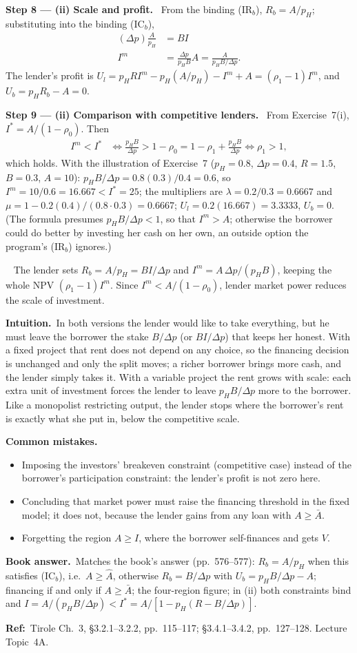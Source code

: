 \documentclass[11pt,a4paper]{article}
\newcommand{\step}[2]{\par\medskip\noindent\textbf{Step #1 --- #2.}~}
\newcommand{\intuition}{\par\medskip\noindent\textbf{Intuition.}~}
\newcommand{\bookans}{\par\medskip\noindent\textbf{Book answer.}~}
\newcommand{\refbib}{\par\smallskip\noindent\textbf{Ref:}~}
\newcommand{\answer}[1]{\par\smallskip\noindent\fbox{\textbf{Answer #1.}}~}
\newcommand{\pitfalls}{\par\medskip\noindent\textbf{Common mistakes.}}
\begin{document}
\step{8}{(ii) Scale and profit} From the binding (IR$_b$), $R_b=A/p_H$; substituting into the
binding (IC$_b$),
\begin{align}
  (\Delta p)\frac{A}{p_H} &= BI \nonumber\\
  I^m &= \frac{\Delta p}{p_HB}A = \frac{A}{p_HB/\Delta p}. \label{r4e8-Im}
\end{align}
The lender's profit is $U_l=p_HRI^m-p_H(A/p_H)-I^m+A=(\rho_1-1)I^m$, and $U_b=p_HR_b-A=0$.

\step{9}{(ii) Comparison with competitive lenders} From Exercise~7(i), $I^*=A/(1-\rho_0)$. Then
\begin{align}
  I^m<I^* &\iff \frac{p_HB}{\Delta p}>1-\rho_0 = 1-\rho_1+\frac{p_HB}{\Delta p} \iff \rho_1>1, \nonumber
\end{align}
which holds. With the illustration of Exercise~7 ($p_H=0.8$, $\Delta p=0.4$, $R=1.5$, $B=0.3$,
$A=10$): $p_HB/\Delta p=0.8(0.3)/0.4=0.6$, so $I^m=10/0.6=16.667<I^*=25$; the multipliers are
$\lambda=0.2/0.3=0.6667$ and $\mu=1-0.2(0.4)/(0.8\cdot0.3)=0.6667$; $U_l=0.2(16.667)=3.3333$,
$U_b=0$. (The formula presumes $p_HB/\Delta p<1$, so that $I^m>A$; otherwise the borrower could
do better by investing her cash on her own, an outside option the program's (IR$_b$) ignores.)

\answer{(ii)} The lender sets $R_b=A/p_H=BI/\Delta p$ and $I^m=A\,\Delta p/(p_HB)$, keeping the
whole NPV $(\rho_1-1)I^m$. Since $I^m<A/(1-\rho_0)$, lender market power reduces the scale of
investment.

\intuition In both versions the lender would like to take everything, but he must leave the
borrower the stake $B/\Delta p$ (or $BI/\Delta p$) that keeps her honest. With a fixed project
that rent does not depend on any choice, so the financing decision is unchanged and only the
split moves; a richer borrower brings more cash, and the lender simply takes it. With a variable
project the rent grows with scale: each extra unit of investment forces the lender to leave
$p_HB/\Delta p$ more to the borrower. Like a monopolist restricting output, the lender stops
where the borrower's rent is exactly what she put in, below the competitive scale.
\pitfalls
\begin{itemize}
  \item Imposing the investors' breakeven constraint (competitive case) instead of the
        borrower's participation constraint: the lender's profit is not zero here.
  \item Concluding that market power must raise the financing threshold in the fixed model; it
        does not, because the lender gains from any loan with $A\ge\bar A$.
  \item Forgetting the region $A\ge I$, where the borrower self-finances and gets $V$.
\end{itemize}
\bookans Matches the book's answer (pp.~576--577): $R_b=A/p_H$ when this satisfies (IC$_b$),
i.e.\ $A\ge\hat A$, otherwise $R_b=B/\Delta p$ with $U_b=p_HB/\Delta p-A$; financing if and only if
$A\ge\bar A$; the four-region figure; in (ii) both constraints bind and
$I=A/(p_HB/\Delta p)<I^*=A/[1-p_H(R-B/\Delta p)]$.
\refbib{Tirole Ch.~3, \S3.2.1--3.2.2, pp.~115--117; \S3.4.1--3.4.2, pp.~127--128. Lecture Topic~4A.}
\end{document}
